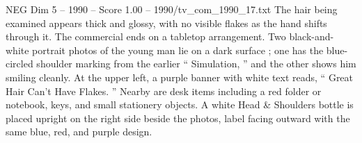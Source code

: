 \begin{textsample}{NEG Dim 5 – 1990 – Score 1.00 – 1990/tv\_com\_1990\_17.txt}
The hair being examined appears thick and glossy, with no visible flakes as the hand shifts through it.
The commercial ends on a tabletop arrangement.
Two black-and-white portrait photos of the young man lie on a dark surface ; one has the blue-circled shoulder marking from the earlier “ Simulation, ” and the other shows him smiling cleanly.
At the upper left, a purple banner with white text reads, “ Great Hair Can't Have Flakes. ” Nearby are desk items including a red folder or notebook, keys, and small stationery objects.
A white Head \& Shoulders bottle is placed upright on the right side beside the photos, label facing outward with the same blue, red, and purple design.

\end{textsample}
